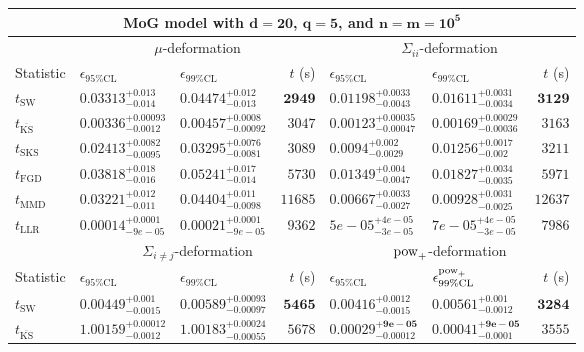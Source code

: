 \begin{tabular}{l|llr|llr}
	\toprule
	\multicolumn{7}{c}{{\bf MoG model with $\mathbf{d=20}$, $\mathbf{q=5}$, and $\mathbf{n=m=10^{5}}$}} \\
	\toprule
	\multicolumn{1}{c}{} & \multicolumn{3}{c}{$\mu$-deformation} & \multicolumn{3}{c}{$\Sigma_{ii}$-deformation} \\
	Statistic & $\epsilon_{95\%\mathrm{CL}}$ & $\epsilon_{99\%\mathrm    {CL}}$ & $t$ (s) & $\epsilon_{95\%\mathrm{CL}}$ & $\epsilon_{99\%\mathrm{CL}}$ & $t$ (s) \\
	\midrule
	$t_{\mathrm{SW}}$ & $0.03313_{-0.014}^{+0.013}$ & $0.04474_{-0.013}^{+0.012}$ & ${\mathbf{2949}}$ & $0.01198_{-0.0043}^{+0.0033}$ & $0.01611_{-0.0034}^{+0.0031}$ & ${\mathbf{3129}}$ \\
	$t_{\overline{\mathrm{KS}}}$ & ${\mathbf{0.00336_{-0.0012}^{+0.00093}}}$ & ${\mathbf{0.00457_{-0.00092}^{+0.0008}}}$ & $3047$ & ${\mathbf{0.00123_{-0.00047}^{+0.00035}}}$ & ${\mathbf{0.00169_{-0.00036}^{+0.00029}}}$ & $3163$ \\
	$t_{\mathrm{SKS}}$ & $0.02413_{-0.0095}^{+0.0082}$ & $0.03295_{-0.0081}^{+0.0076}$ & $3089$ & $0.0094_{-0.0029}^{+0.002}$ & $0.01256_{-0.002}^{+0.0017}$ & $3211$ \\
	$t_{\mathrm{FGD}}$ & $0.03818_{-0.016}^{+0.018}$ & $0.05241_{-0.014}^{+0.017}$ & $5730$ & $0.01349_{-0.0047}^{+0.004}$ & $0.01827_{-0.0035}^{+0.0034}$ & $5971$ \\
	$t_{\mathrm{MMD}}$ & $0.03221_{-0.011}^{+0.012}$ & $0.04404_{-0.0098}^{+0.011}$ & $11685$ & $0.00667_{-0.0027}^{+0.0033}$ & $0.00928_{-0.0025}^{+0.0031}$ & $12637$ \\
	$t_{\mathrm{LLR}}$ & $0.00014_{-9e-05}^{+0.0001}$ & $0.00021_{-9e-05}^{+0.0001}$ & $9362$ & $5e-05_{-3e-05}^{+4e-05}$ & $7e-05_{-3e-05}^{+4e-05}$ & $7986$ \\
	\toprule
	\multicolumn{1}{c}{} & \multicolumn{3}{c}{$\Sigma_{i\neq j}$-deformation} & \multicolumn{3}{c}{$\rm{pow}_{+}$-deformation} \\
	Statistic & $\epsilon_{95\%\mathrm{CL}}$ & $\epsilon_{99\%\mathrm{CL}}$ & $t$ (s) & $\epsilon_{95\%\mathrm{CL}}$ & $\epsilon^{\rm   {pow}_{+}}_{99\%\mathrm{CL}}$ & $t$ (s) \\
	\midrule
	$t_{\mathrm{SW}}$ & $0.00449_{-0.0015}^{+0.001}$ & $0.00589_{-0.00097}^{+0.00093}$ & ${\mathbf{5465}}$ & $0.00416_{-0.0015}^{+0.0012}$ & $0.00561_{-0.0012}^{+0.001}$ & ${\mathbf{3284}}$ \\
	$t_{\overline{\mathrm{KS}}}$ & $1.00159_{-0.0012}^{+0.00012}$ & $1.00183_{-0.00055}^{+0.00024}$ & $5678$ & ${\mathbf{0.00029_{-0.00012}^{+9e-05}}}$ & ${\mathbf{0.00041_{-0.0001}^{+9e-05}}}$ & $3555$ \\

\end{tabular}
